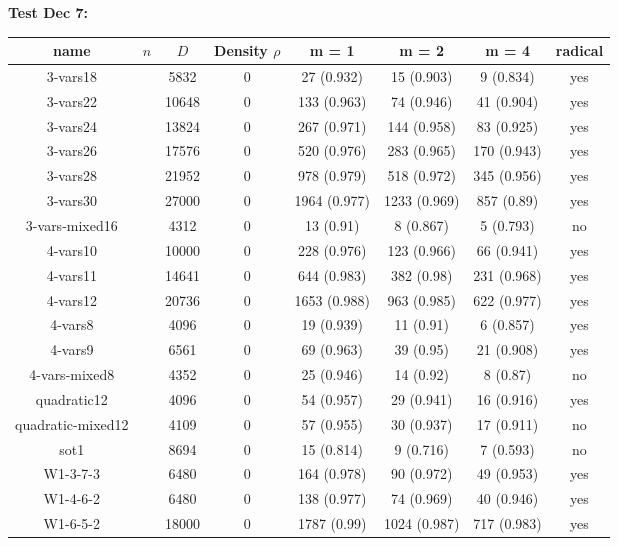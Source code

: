 \documentclass[12pt]{article}
\begin{document}
\textbf{Test Dec 7:}\\
\begin{tabular}{c|c|c|c|c|c|c|c}
	\textbf{name}& $n$ & $D$ & \textbf{Density $\rho$} & m = 1 & m = 2 & m = 4 & \textbf{radical} \\
	\hline
	3-vars18& &5832&0&27 (0.932)&15 (0.903)&9 (0.834)&yes\\
	3-vars22& &10648&0&133 (0.963)&74 (0.946)&41 (0.904)&yes\\
	3-vars24& &13824&0&267 (0.971)&144 (0.958)&83 (0.925)&yes\\
	3-vars26& &17576&0&520 (0.976)&283 (0.965)&170 (0.943)&yes\\
	3-vars28& &21952&0&978 (0.979)&518 (0.972)&345 (0.956)&yes\\
	3-vars30& &27000&0&1964 (0.977)&1233 (0.969)&857 (0.89)&yes\\
	3-vars-mixed16& &4312&0&13 (0.91)&8 (0.867)&5 (0.793)&no\\
	4-vars10& &10000&0&228 (0.976)&123 (0.966)&66 (0.941)&yes\\
	4-vars11& &14641&0&644 (0.983)&382 (0.98)&231 (0.968)&yes\\
	4-vars12& &20736&0&1653 (0.988)&963 (0.985)&622 (0.977)&yes\\
	4-vars8& &4096&0&19 (0.939)&11 (0.91)&6 (0.857)&yes\\
	4-vars9& &6561&0&69 (0.963)&39 (0.95)&21 (0.908)&yes\\
	4-vars-mixed8& &4352&0&25 (0.946)&14 (0.92)&8 (0.87)&no\\
	quadratic12& &4096&0&54 (0.957)&29 (0.941)&16 (0.916)&yes\\
	quadratic-mixed12& &4109&0&57 (0.955)&30 (0.937)&17 (0.911)&no\\
	sot1& &8694&0&15 (0.814)&9 (0.716)&7 (0.593)&no\\
	W1-3-7-3& &6480&0&164 (0.978)&90 (0.972)&49 (0.953)&yes\\
	W1-4-6-2& &6480&0&138 (0.977)&74 (0.969)&40 (0.946)&yes\\
	W1-6-5-2& &18000&0&1787 (0.99)&1024 (0.987)&717 (0.983)&yes\\
\end{tabular}
	
\end{document}
